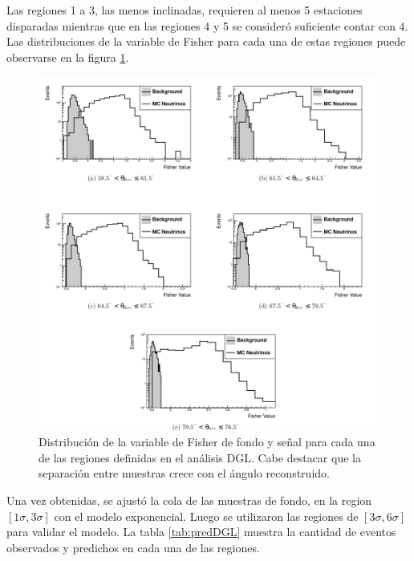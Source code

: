 	Las regiones 1 a 3, las menos inclinadas, requieren al menos 5 estaciones disparadas mientras que en las regiones 4 y 5 se consideró suficiente contar con 4.
	Las distribuciones de la variable de Fisher para cada una de estas regiones puede observarse en la figura \ref{fig:fisherDGL}.
	\begin{figure}[ht]
	\begin{center}
	\includegraphics[width=\textwidth]{fig/seleccionAuger/fisherDGL}
	\caption{Distribuci\'on de la variable de Fisher de fondo y se\~nal para cada una de las regiones definidas en el an\'alisis DGL. Cabe destacar que la separación entre muestras crece con el ángulo reconstruido.}
	\label{fig:fisherDGL}
	\end{center}
	\end{figure}
	Una vez obtenidas, se ajustó la cola de las muestras de fondo, en la region $[1\sigma, 3\sigma]$ con el modelo exponencial.
	Luego se utilizaron las regiones de $[3\sigma, 6\sigma]$ para validar el modelo.
	La tabla \ref{tab:predDGL} muestra la cantidad de eventos observados y predichos en cada una de las regiones.
